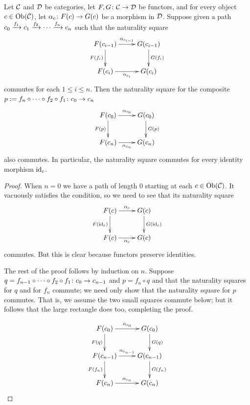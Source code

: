 \begin{lemma}\label{lemma:generators for nattrans}

Let $\mathcal{C}$ and $\mathcal{D}$ be categories, let $F,G\colon\mathcal{C}\rightarrow\mathcal{D}$ be functors, and for every object $c\in\textnormal{Ob}(\mathcal{C})$, let $\alpha_c\colon F(c)\rightarrow G(c)$ be a morphism in $\mathcal{D}$. Suppose given a path $c_0\xrightarrow{f_1}c_1\xrightarrow{f_2}\cdots\xrightarrow{f_n} c_n$ such that the naturality square 
$$
\xymatrix{F(c_{i-1})\ar[d]_{F(f_i)}\ar[r]^{\alpha_{c_{i-1}}}&G(c_{i-1})\ar[d]^{G(f_i)}\\F(c_i)\ar[r]_{\alpha_{c_i}}&G(c_i)
}
$$
commutes for each $1\leq i\leq n$. Then the naturality square for the composite $p:=f_n\circ\cdots\circ f_2\circ f_1\colon c_0\rightarrow c_n$ 
$$\xymatrix{F(c_0)\ar[r]^{\alpha_{c_0}}\ar[d]_{F(p)}&G(c_0)\ar[d]^{G(p)}\\F(c_n)\ar[r]_{\alpha_{c_n}}&G(c_n)}
$$
also commutes. In particular, the naturality square commutes for every identity morphism $\textnormal{id}_c$.

\end{lemma}

\begin{proof}

When $n=0$ we have a path of length 0 starting at each $c\in\textnormal{Ob}(\mathcal{C})$. It vacuously satisfies the condition, so we need to see that its naturality square 
$$\xymatrix{F(c)\ar[r]^{\alpha_c}\ar[d]_{F(\id_c)}&G(c)\ar[d]^{G(\id_c)}\\F(c)\ar[r]_{\alpha_c}&G(c)}
$$
commutes. But this is clear because functors preserve identities. 

The rest of the proof follows by induction on $n$. Suppose $q=f_{n-1}\circ\cdots\circ f_2\circ f_1\colon c_0\rightarrow c_{n-1}$ and $p=f_n\circ q$ and that the naturality squares for $q$ and for $f_n$ commute; we need only show that the naturality square for $p$ commutes. That is, we assume the two small squares commute below; but it follows that the large rectangle does too, completing the proof.

$$
\xymatrix{
F(c_0)\ar[r]^{\alpha_{c_0}}\ar[d]_{F(q)}&G(c_0)\ar[d]^{G(q)}\\
F(c_{n-1})\ar[r]^{\alpha_{c_{n-1}}}\ar[d]_{F(f_n)}&G(c_{n-1})\ar[d]^{G(f_n)}\\
F(c_n)\ar[r]^{\alpha_{c_n}}&G(c_n)
}
$$

\end{proof}


